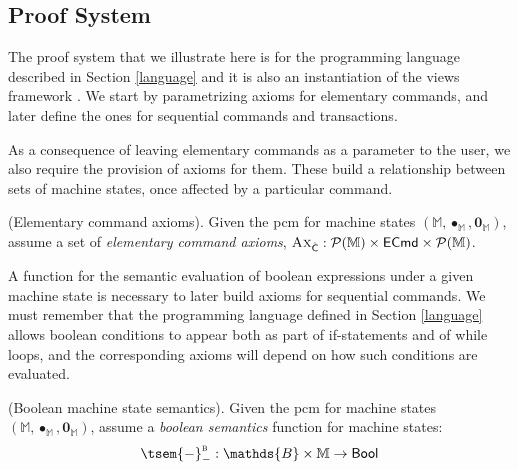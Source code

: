 \subsection{Proof System}

The proof system that we illustrate here is for the programming language described in Section \ref{language} and it is also an instantiation of the views framework \cite{views}. We start by parametrizing axioms for elementary commands, and later define the ones for sequential commands and transactions.

As a consequence of leaving elementary commands as a parameter to the user, we also require the provision of axioms for them. These build a relationship between sets of machine states, once affected by a particular command.
\begin{param}
	\label{param:ecmdAx}
	(Elementary command axioms).
	Given the pcm for machine states $(\mathbb{M}, \bullet_\mathbb{M}, \mathbf{0}_\mathbb{M})$, assume a set of \emph{elementary command axioms}, $\textsc{Ax}_{\hat{\mathsf{C}}} : \mathcal{P}(\mathbb{M}) \times \mathsf{ECmd} \times \mathcal{P}(\mathbb{M})$.
\end{param}

A function for the semantic evaluation of boolean expressions under a given machine state is necessary to later build axioms for sequential commands. We must remember that the programming language defined in Section \ref{language} allows boolean conditions to appear both as part of if-statements and of while loops, and the corresponding axioms will depend on how such conditions are evaluated.
\begin{param}
	\label{param:boolMachine}
	(Boolean machine state semantics).
	Given the pcm for machine states $(\mathbb{M}, \bullet_\mathbb{M}, \mathbf{0}_\mathbb{M})$, assume a \emph{boolean semantics} function for machine states:
	\[
		\tsem{-}^\textsc{b}_- : \mathds{B} \times \mathbb{M} \rightarrow \mathsf{Bool}
	\]
\end{param}

